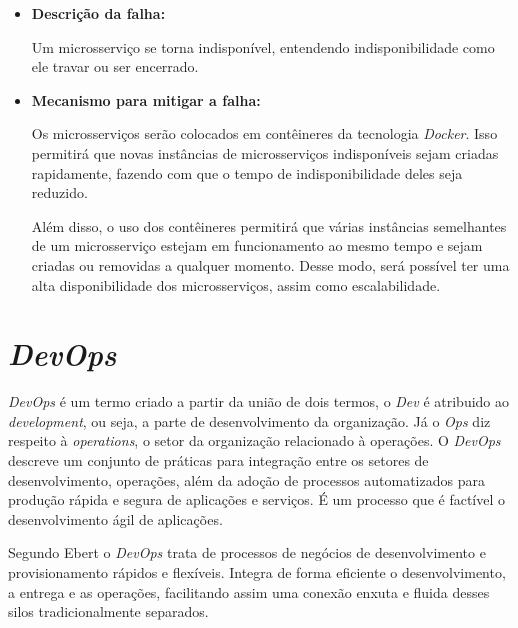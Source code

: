 \begin{itemize}
    \item \textbf{Descrição da falha:}

    Um microsserviço se torna indisponível, entendendo indisponibilidade como ele travar ou ser encerrado.

    \item \textbf{Mecanismo para mitigar a falha:}

    Os microsserviços serão colocados em contêineres da tecnologia \textit{Docker}. Isso permitirá que novas instâncias de microsserviços indisponíveis sejam criadas rapidamente, fazendo com que o tempo de indisponibilidade deles seja reduzido.

    Além disso, o uso dos contêineres permitirá que várias instâncias semelhantes de um microsserviço estejam em funcionamento ao mesmo tempo e sejam criadas ou removidas a qualquer momento. Desse modo, será possível ter uma alta disponibilidade dos microsserviços, assim como escalabilidade.
\end{itemize}

\section{\textit{DevOps}}

\textit{DevOps} é um termo criado a partir da união de dois termos, o \textit{Dev} é atribuido ao \textit{development}, ou seja, a parte de desenvolvimento da organização. Já o \textit{Ops} diz respeito à \textit{operations}, o setor da organização relacionado à operações. O \textit{DevOps} descreve um conjunto de práticas para integração entre os setores de desenvolvimento, operações, além da adoção de processos automatizados para produção rápida e segura de aplicações e serviços. É um processo que é factível o desenvolvimento ágil de aplicações.

Segundo Ebert \cite{ebert2016devops} o \textit{DevOps} trata de processos de negócios de desenvolvimento e provisionamento rápidos e flexíveis. Integra de forma eficiente o desenvolvimento, a entrega e as operações, facilitando assim uma conexão enxuta e fluida desses silos tradicionalmente separados.

